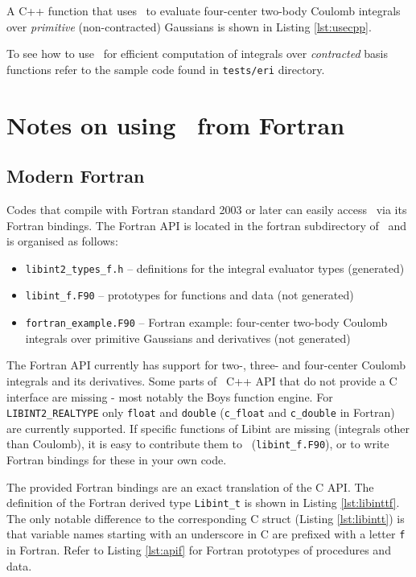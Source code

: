 \documentclass[10pt]{article}
\begin{document}
A C++ function that uses \LIBINT\ to evaluate four-center two-body Coulomb
integrals over {\em primitive} (non-contracted) Gaussians is shown in Listing
\ref{lst:usecpp}.



To see how to use \LIBINT\ for efficient computation of integrals over
{\em contracted} basis functions refer to the sample code found in
{\tt tests/eri} directory.

\section{Notes on using \LIBINT\ from Fortran \label{ssec:fort} }

\subsection{Modern Fortran}

Codes that compile with Fortran standard 2003 or later can easily access \LIBINT\ via its Fortran bindings.
The Fortran API is located in the fortran subdirectory of \LIBINT\ and is organised as follows:
\begin{itemize}
    \item {\tt libint2\_types\_f.h} -- definitions for the integral evaluator types (generated)
    \item {\tt libint\_f.F90} -- prototypes for functions and data (not generated)
    \item {\tt fortran\_example.F90} -- Fortran example: four-center two-body Coulomb integrals over primitive Gaussians and derivatives (not generated)
\end{itemize}

The Fortran API currently has support for two-, three- and four-center Coulomb integrals and its derivatives.
Some parts of \LIBINT\ C++ API that do not provide a C interface are missing - most notably the Boys function engine.
For {\tt LIBINT2\_REALTYPE} only {\tt float} and {\tt double} ({\tt c\_float} and {\tt c\_double} in Fortran) are currently supported.
If specific functions of Libint are missing (integrals other than Coulomb), it is easy to contribute them to \LIBINT\ ({\tt libint\_f.F90}),
or to write Fortran bindings for these in your own code.

The provided Fortran bindings are an exact translation of the C API.
The definition of the Fortran derived type {\tt Libint\_t} is shown in Listing \ref{lst:libinttf}.
The only notable difference to the corresponding C struct (Listing \ref{lst:libintt}) is that variable names starting with an underscore in C are prefixed with a letter {\tt f} in Fortran.
Refer to Listing \ref{lst:apif} for Fortran prototypes of procedures and data.
\end{document}
